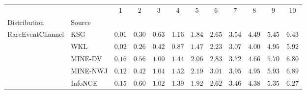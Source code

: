 \begin{tabular}{llcccccccccc}
\toprule
 &  & 1 & 2 & 3 & 4 & 5 & 6 & 7 & 8 & 9 & 10 \\
Distribution & Source &  &  &  &  &  &  &  &  &  &  \\
\midrule
\multirow[l]{5}{*}{RareEventChannel} & KSG & $ 0.01 $ & $ 0.30 $ & $ 0.63 $ & $ 1.16 $ & $ 1.84 $ & $ 2.65 $ & $ 3.54 $ & $ 4.49 $ & $ 5.45 $ & $ 6.43 $ \\
 & WKL & $ 0.02 $ & $ 0.26 $ & $ 0.42 $ & $ 0.87 $ & $ 1.47 $ & $ 2.23 $ & $ 3.07 $ & $ 4.00 $ & $ 4.95 $ & $ 5.92 $ \\
 & MINE-DV & $ 0.16 $ & $ 0.56 $ & $ 1.00 $ & $ 1.44 $ & $ 2.06 $ & $ 2.83 $ & $ 3.72 $ & $ 4.66 $ & $ 5.70 $ & $ 6.80 $ \\
 & MINE-NWJ & $ 0.12 $ & $ 0.42 $ & $ 1.04 $ & $ 1.52 $ & $ 2.19 $ & $ 3.01 $ & $ 3.95 $ & $ 4.95 $ & $ 5.93 $ & $ 6.89 $ \\
 & InfoNCE & $ 0.15 $ & $ 0.60 $ & $ 1.02 $ & $ 1.39 $ & $ 1.92 $ & $ 2.62 $ & $ 3.46 $ & $ 4.38 $ & $ 5.35 $ & $ 6.27 $ \\
\bottomrule
\end{tabular}
